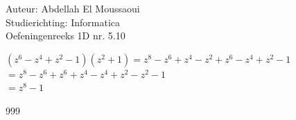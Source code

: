 \documentclass[a4paper]{article}
\begin{document}
  
\noindent \large Auteur: Abdellah El Moussaoui \\
\noindent \large Studierichting: Informatica\\
\noindent \large Oefeningenreeks 1D nr. 5.10\\

\medskip

\normalsize

$(z^6-z^4+z^2-1)(z^2+1) = z^8-z^6+z^4-z^2+z^6-z^4+z^2-1$\\

$= z^8-z^6+z^6+z^4-z^4+z^2-z^2-1$\\

$= z^8-1$\\

\begin{thebibliography}{999}
\end{thebibliography}
\end{document}
